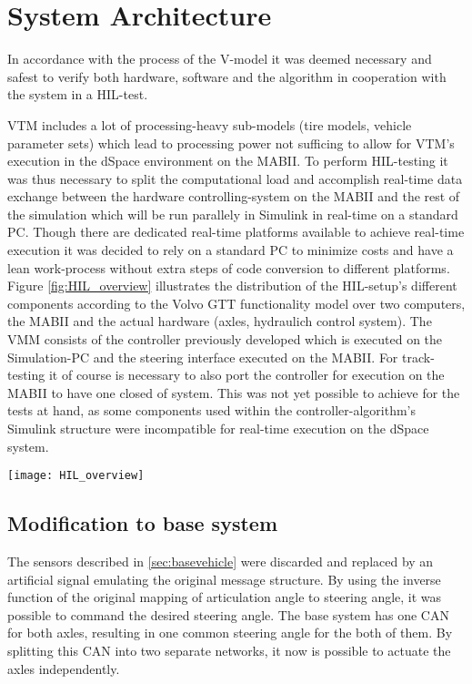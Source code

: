 \documentclass[root.tex]{subfiles}
\begin{document}
{\pagestyle{empty}}
\section{System Architecture}
\label{chap:HiL-Architecture}

In accordance with the process of the V-model it was deemed necessary and safest to verify both hardware, software and the algorithm in cooperation with the system in a \gls{HIL}-test. 

\gls{VTM} includes a lot of processing-heavy sub-models (tire models, vehicle parameter sets) which lead to processing power not sufficing to allow for \gls{VTM}'s execution in the dSpace environment on the \gls{MABII}. To perform \gls{HIL}-testing it was thus necessary to split the computational load and accomplish real-time data exchange between the hardware controlling-system on the \gls{MABII} and the rest of the simulation which will be run parallely in Simulink in real-time on a standard PC. Though there are dedicated real-time platforms available to achieve real-time execution it was decided to rely on a standard PC to minimize costs and have a lean work-process without extra steps of code conversion to different platforms. Figure \ref{fig:HIL_overview} illustrates the distribution of the \gls{HIL}-setup's different components according to the Volvo GTT functionality model over two computers, the \gls{MABII} and the actual hardware (axles, hydraulich control system). The \gls{VMM} consists of the controller previously developed which is executed on the Simulation-PC and the steering interface executed on the \gls{MABII}. For track-testing it of course is necessary to also port the controller for execution on the \gls{MABII} to have one closed of system. This was not yet possible to achieve for the tests at hand, as some components used within the controller-algorithm's  Simulink structure were incompatible for real-time execution on the dSpace system.

\begin{figure*}[h]
	\centering
	\texttt{[image: HIL\_overview]}
	\caption[Overview of \acrlong{HIL}-simulation, distribution of sub-functions over different physical platforms (top) and correlation to Volvo functionality architecture (bottom)]{Overview of \gls{HIL}-simulation, distribution of sub-functions over different physical platforms (top) and correlation to Volvo functionality architecture (bottom)}
	
	\label{fig:HIL_overview}
\end{figure*}

\subsection{Modification to base system}
The sensors described in \ref{sec:basevehicle} were discarded and replaced by an artificial signal emulating the original message structure. By using the inverse  function of the original mapping of articulation angle to steering angle, it was possible to command the desired steering angle. The base system has one \gls{CAN} for both axles, resulting in one common steering angle for the both of them. By splitting this \gls{CAN} into two separate networks, it now is possible to actuate the axles independently. 
\end{document}
